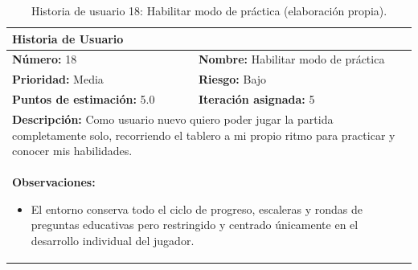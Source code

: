 \begin{table}[H]
\centering
\caption{Historia de usuario 18: Habilitar modo de práctica (elaboración propia).\label{tab:hu18}}
\renewcommand{\arraystretch}{1.5}
\begin{tabular}{|p{}|p{}|}
\hline
\multicolumn{2}{|l|}{\textbf{Historia de Usuario}} \\
\hline
\textbf{Número:} 18 & \textbf{Nombre:} Habilitar modo de práctica \\
\hline
\textbf{Prioridad:} Media & \textbf{Riesgo:} Bajo \\
\hline
\textbf{Puntos de estimación:} 5.0 & \textbf{Iteración asignada:} 5 \\
\hline
\multicolumn{2}{|p{0.945\textwidth}|}{\textbf{Descripción:} Como usuario nuevo quiero poder jugar la partida completamente solo, recorriendo el tablero a mi propio ritmo para practicar y conocer mis habilidades.} \\
\hline
\multicolumn{2}{|p{0.945\textwidth}|}{\textbf{Observaciones:}
\vspace{-0.5em}
\begin{itemize}
    \setlength\itemsep{0em}
    \item El entorno conserva todo el ciclo de progreso, escaleras y rondas de preguntas educativas pero restringido y centrado únicamente en el desarrollo individual del jugador.
\end{itemize}
\vspace{-1em}
} \\
\hline
\end{tabular}
\end{table}
